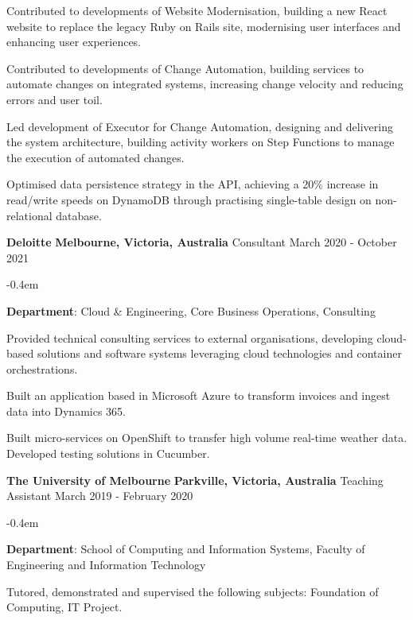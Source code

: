 \documentclass{cv}
\begin{document}
\begin{list}{}{\setlength{\leftmargin}{0em}}
\begin{list}{\raisebox{0.2em}{\tiny$\bullet$}}{\leftmargin=1.0em}
        \item Contributed to developments of Website Modernisation, building a new React website to replace the legacy Ruby on Rails site, modernising user interfaces and enhancing user experiences.
        \item Contributed to developments of Change Automation, building services to automate changes on integrated systems, increasing change velocity and reducing errors and user toil.
        \item Led development of Executor for Change Automation, designing and delivering the system architecture, building activity workers on Step Functions to manage the execution of automated changes.
        \item Optimised data persistence strategy in the API, achieving a 20\% increase in read/write speeds on DynamoDB through practising single-table design on non-relational database.
    \end{list}
\item[]
    \textbf{Deloitte} \hfill \textbf{Melbourne, Victoria, Australia}%
    \vspace{0.1em} \newline 
    {Consultant} \hfill {March 2020 - October 2021}%
    \begin{list}{\raisebox{0.2em}{\tiny$\bullet$}}{\leftmargin=1.0em}
    \itemsep -0.4em \vspace{-0.4em}
        \item \textbf{Department}: Cloud \& Engineering, Core Business Operations, Consulting
        \item Provided technical consulting services to external organisations, developing cloud-based solutions and software systems leveraging cloud technologies and container orchestrations.
        \item Built an application based in Microsoft Azure to transform invoices and ingest data into Dynamics 365.
        \item Built micro-services on OpenShift to transfer high volume real-time weather data. Developed testing solutions in Cucumber.
    \end{list}
\item[]
    \textbf{The University of Melbourne} \hfill \textbf{Parkville, Victoria, Australia}%
    \vspace{0.1em} \newline 
    {Teaching Assistant} \hfill {March 2019 - February 2020}%
    \begin{list}{\raisebox{0.2em}{\tiny$\bullet$}}{\leftmargin=1.0em}
    \itemsep -0.4em \vspace{-0.4em}
        \item \textbf{Department}: School of Computing and Information Systems, Faculty of Engineering and Information Technology
        \item Tutored, demonstrated and supervised the following subjects: Foundation of Computing, IT Project.
    \end{list}
\end{list}
\end{document}
